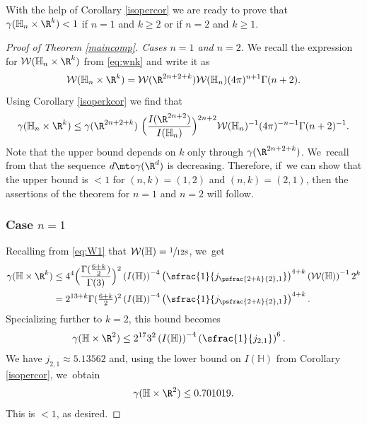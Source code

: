 With the help of Corollary \ref{isopercor} we are ready to prove that $\gamma(\mathbb H_n\times\R^k)<1$ if $n=1$ and $k\geq 2$ or if $n=2$ and $k\geq 1$.

\skpt
\begin{proof}[Proof of Theorem \ref{maincomp}. Cases $n\!=\!1$ and $n\!=\!2$]
We recall the expression for $\mathcal W(\mathbb H_n\times\R^k)$ from \eqref{eq:wnk} and write it as
\[
\mathcal W(\mathbb H_n\times\R^k) = \mathcal W(\R^{2n+2+k}) \mathcal W(\mathbb H_n) (4\pi)^{n+1} \Gamma(n+2).
\]
Using Corollary \ref{isoperkcor} we find that
\begin{equation}
\label{eq:gammankbound}
\gamma(\mathbb H_n\times\R^k) \leq \gamma(\R^{2n+2+k})\ \Bigl(\frac{I(\R^{2n+2})}{I(\mathbb H_n)}\Bigr)^{2n+2} \mathcal W(\mathbb H_n)^{-1} (4\pi)^{-n-1} \Gamma(n+2)^{-1}.
\end{equation}
Note that the upper bound depends on $k$ only through $\gamma(\R^{2n+2+k})$. We~recall from \cite[Th.\,5.1]{HPS} that the sequence $d\mto \gamma(\R^d)$ is decreasing. Therefore, if~we can show that the upper bound is $<1$ for $(n,k)=(1,2)$ and $(n,k)=(2,1)$, then the assertions of the theorem for $n=1$ and $n=2$ will follow.

\subsubsection*{Case $n=1$} Recalling from \eqref{eq:W1} that $\mathcal W(\mathbb H) = \sfrac1{128}$, we~get
\begin{align}\label{eq:gammankboundn1}
\gamma(\mathbb H\times\R^k)
& \leq 4^4 \Bigl(\frac{\Gamma(\frac{6+k}{2})}{\Gamma(3)}\Bigr)^2
\left(I(\mathbb H)\right)^{-4} \left(\sfrac{1}{j_{\psfrac{2+k}{2},1}}\right)^{4+k}
\left(\mathcal W(\mathbb H)\right)^{-1} 2^k \notag \\
& = 2^{13+k} \Gamma(\tfrac{6+k}2)^2 \left(I(\mathbb H)\right)^{-4} \left(\sfrac{1}{j_{\psfrac{2+k}{2},1}}\right)^{4+k}.
\end{align}
Specializing further to $k=2$, this bound becomes
\begin{align*}
\gamma(\mathbb H\times\R^2)
& \leq 2^{17} 3^2 \left(I(\mathbb H)\right)^{-4} \left(\sfrac{1}{j_{2,1}}\right)^6.
\end{align*}
We have $j_{2,1}\approx 5.13562$ \cite[Table\,9.5]{AbSt} and, using the lower bound on $I(\mathbb H)$ from Corollary \ref{isopercor}, we~obtain
\[
\gamma(\mathbb H\times\R^2) \leq 0.701019.
\]
This is $<1$, as desired.


\end{proof}

